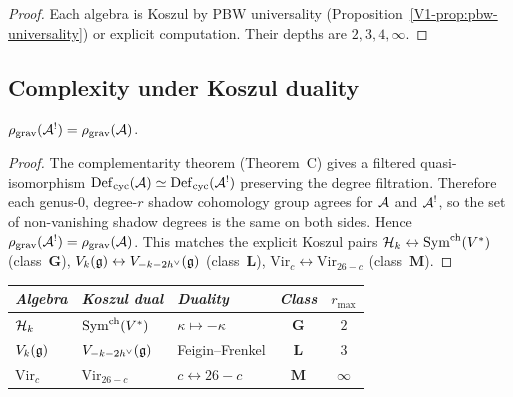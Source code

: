 \begin{proof}
Each algebra is Koszul by PBW universality
(Proposition~\ref{V1-prop:pbw-universality}) or explicit
computation. Their depths are $2, 3, 4, \infty$.
\end{proof}



\subsection{Complexity under Koszul duality}

\begin{proposition}
\ClaimStatusProvedHere
$\rho_{\mathrm{grav}}(\mathcal{A}^!) = \rho_{\mathrm{grav}}(\mathcal{A})$.
\end{proposition}

\begin{proof}
The complementarity theorem (Theorem~C) gives a filtered
quasi-isomorphism
$\mathrm{Def}_{\mathrm{cyc}}(\mathcal{A}) \simeq \mathrm{Def}_{\mathrm{cyc}}(\mathcal{A}^!)$ preserving the degree filtration.
Therefore each genus-$0$, degree-$r$ shadow cohomology group agrees for
$\mathcal{A}$ and $\mathcal{A}^!$, so the set of non-vanishing shadow degrees is the
same on both sides. Hence
$\rho_{\mathrm{grav}}(\mathcal{A}^!) = \rho_{\mathrm{grav}}(\mathcal{A})$.
This matches the explicit Koszul pairs
$\mathcal{H}_k \leftrightarrow \operatorname{Sym}^{\mathrm{ch}}(V^*)$ (class~$\mathbf{G}$),
$V_k(\mathfrak{g}) \leftrightarrow V_{-k-2h^\vee}(\mathfrak{g})$ (class~$\mathbf{L}$),
$\mathrm{Vir}_c \leftrightarrow \mathrm{Vir}_{26-c}$
(class~$\mathbf{M}$).
\end{proof}

\begin{corollary}
\ClaimStatusProvedHere
\begin{center}
\small
\renewcommand{\arraystretch}{1.15}
\begin{tabular}{lllcc}
\toprule
\emph{Algebra} & \emph{Koszul dual} &
 \emph{Duality} & \emph{Class} & $r_{\max}$ \\
\midrule
$\mathcal{H}_k$ & $\operatorname{Sym}^{\mathrm{ch}}(V^*)$ &
 $\kappa \mapsto -\kappa$ & $\mathbf{G}$ & $2$ \\
$V_k(\mathfrak{g})$ & $V_{-k-2h^\vee}(\mathfrak{g})$ &
 Feigin--Frenkel & $\mathbf{L}$ & $3$ \\
$\mathrm{Vir}_c$ & $\mathrm{Vir}_{26-c}$ &
 $c \leftrightarrow 26-c$ & $\mathbf{M}$ & $\infty$ \\
\bottomrule
\end{tabular}
\end{center}
\end{corollary}


